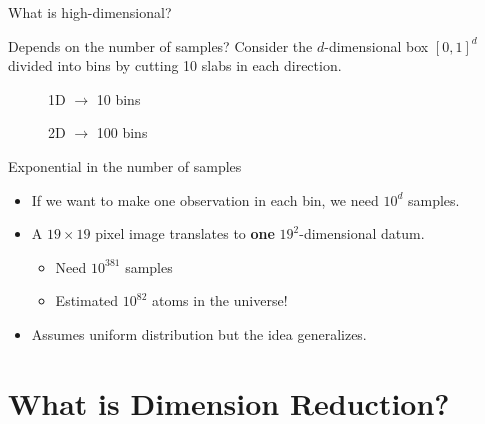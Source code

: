 \documentclass{beamer}
\begin{document}
\begin{frame}{What is high-dimensional?}
\begin{block}{Depends on the number of samples?}
Consider the $d$-dimensional box $[0,1]^d$ divided into bins by cutting 10 slabs in each direction.
\begin{multicols}{2}

\begin{figure}
\caption{1D $\rightarrow$ 10 bins}
\end{figure}

\begin{figure}
\caption{2D $\rightarrow$ 100 bins}
\end{figure}


\end{multicols}
\end{block}\pause

\begin{block}{Exponential in the number of samples}
\begin{itemize}
\item If we want to make one observation in each bin, we need $10^d$ samples. 
\item A $19 \times 19$ pixel image translates to {\bf one}  $19^2$-dimensional datum.
\begin{itemize}
	\item Need $10^{381}$ samples
	\item Estimated $10^{82}$ atoms in the universe!
\end{itemize}
\item Assumes uniform distribution but the idea generalizes.
\end{itemize}
 

\end{block}

\end{frame}


\section{What is Dimension Reduction?}
\end{document}
